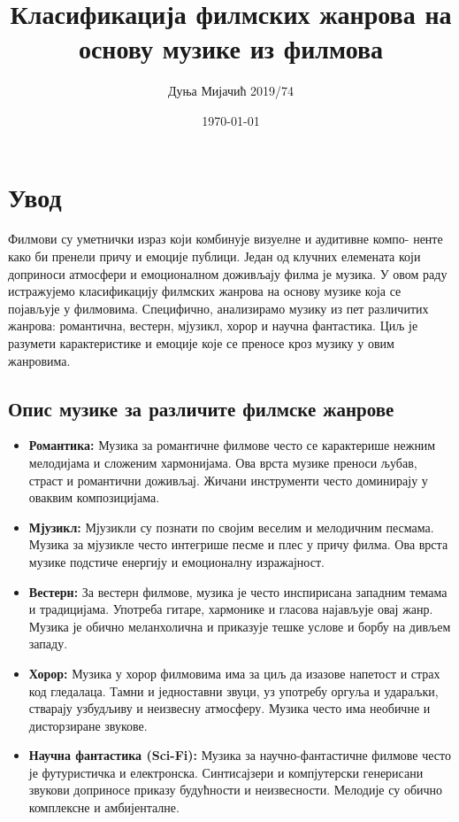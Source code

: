 \documentclass{article}
\title{Класификација филмских жанрова на основу музике из филмова}
\author{Дуња Мијачић 2019/74}
\date{\today}
\begin{document}
\maketitle

\newpage

\section{Увод}
Филмови су уметнички израз који комбинује визуелне и аудитивне компо- ненте како би пренели причу и емоције публици. Један од клучних елемената који доприноси атмосфери и емоционалном доживљају филма је музика. У овом раду истражујемо класификацију филмских жанрова на основу музике која се појављује у филмовима. Специфично, анализирамо музику из пет различитих жанрова: романтична, вестерн, мјузикл, хорор и научна фантастика. Циљ је разумети карактеристике и емоције које се преносе кроз музику у овим жанровима.

\subsection{Опис музике за различите филмске жанрове}

\begin{itemize}
\item \textbf{Романтика:} Музика за романтичне филмове често се карактерише нежним мелодијама и сложеним хармонијама. Ова врста музике преноси љубав, страст и романтични доживљај. Жичани инструменти често доминирају у оваквим композицијама.

\item \textbf{Мјузикл:} Мјузикли су познати по својим веселим и мелодичним песмама. Музика за мјузикле често интегрише песме и плес у причу филма. Ова врста музике подстиче енергију и емоционалну изражајност.

\item \textbf{Вестерн:} За вестерн филмове, музика је често инспирисана западним темама и традицијама. Употреба гитаре, хармонике и гласова најављује овај жанр. Музика је обично меланхолична и приказује тешке услове и борбу на дивљем западу.

\item \textbf{Хорор:} Музика у хорор филмовима има за циљ да изазове напетост и страх код гледалаца. Тамни и једноставни звуци, уз употребу оргуља и удараљки, стварају узбудљиву и неизвесну атмосферу. Музика често има необичне и дисторзиране звукове.

\item \textbf{Научна фантастика (Sci-Fi):} Музика за научно-фантастичне филмове често је футуристичка и електронска. Синтисајзери и компјутерски генерисани звукови доприносе приказу будућности и неизвесности. Мелодије су обично комплексне и амбијенталне.
\end{itemize}
\end{document}

